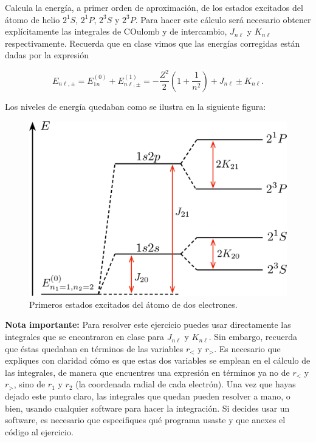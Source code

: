 \documentclass[./../main.tex]{subfiles}
\begin{document}
    \begin{exercise}
        Calcula la energía, a primer orden de aproximación, de los estados excitados del átomo de helio \(2^{1}S\), \(2^{1}P\), \(2^{3}S\) y \(2^{3}P\). Para hacer este cálculo será necesario obtener explícitamente las integrales de COulomb y de intercambio, \(J_{n\ell}\) y \(K_{n\ell}\) respectivamente. Recuerda que en clase vimos que las energías corregidas están dadas por la expresión

        \begin{equation}
            E_{n\ell,\pm} = E_{1n}^{(0)} + E_{n\ell,\pm}^{(1)} = -\dfrac{Z^{2}}{2}\left(1 + \dfrac{1}{n^{2}}\right) + J_{n\ell} \pm K_{n\ell}.
            \label{eq:energy-correction}
        \end{equation}

        Los niveles de energía quedaban como se ilustra en la siguiente figura:

        \begin{figure}[htb]
            \centering
            \includegraphics{first-excited-states}
            \caption{Primeros estados excitados del átomo de dos electrones.}
            \label{fig:first-excites-states-helium}
        \end{figure}

        \textbf{Nota importante:} Para resolver este ejercicio puedes usar directamente las integrales que se encontraron en clase para \(J_{n\ell}\) y \(K_{n\ell}\). Sin embargo, recuerda que éstas quedaban en términos de las variables \(r_{<}\) y \(r_{>}\). Es necesario que expliques con claridad cómo es que estas dos variables se emplean en el cálculo de las integrales, de manera que encuentres una expresión en términos ya no de \(r_{<}\) y \(r_{>}\), sino de \(r_{1}\) y \(r_{2}\) (\idest la coordenada radial de cada electrón). Una vez que hayas dejado este punto claro, las integrales que quedan pueden resolver a mano, o bien, usando cualquier software para hacer la integración. Si decides usar un software, es necesario que especifiques qué programa usaste y que anexes el código al ejercicio.


\end{exercise}
\end{document}
